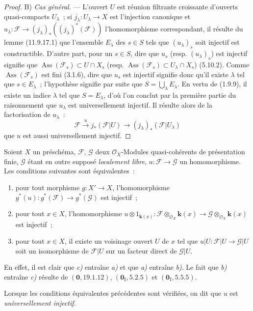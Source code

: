 \begin{proof}
B) \emph{Cas général.} --- L'ouvert $U$ est réunion filtrante croissante
d'ouverts quasi-compacts $U_\lambda$~; si $j_\lambda:U_\lambda\to X$ est
l'injection canonique et
$u_\lambda:\mathcal F\to(j_\lambda)_*((j_\lambda)^*(\mathcal F))$
l'homomorphisme correspondant, il résulte du lemme (11.9.17.1) que l'ensemble
$E_\lambda$ des $s\in S$ tels que $(u_\lambda)_s$ soit injectif est
constructible. D'autre part, pour un $s\in S$, dire que $u_s$ (resp.
$(u_\lambda)_s$) est injectif signifie que
$\operatorname{Ass}(\mathcal F_s)\subset U\cap X_s$ (resp.
$\operatorname{Ass}(\mathcal F_s)\subset U_\lambda\cap X_s$) (5.10.2).
Comme $\operatorname{Ass}(\mathcal F_s)$ est fini (3.1.6), dire que $u_s$ est
injectif signifie donc qu'il existe $\lambda$ tel que $s\in E_\lambda$~;
l'hypothèse signifie par suite que $S=\bigcup_\lambda E_\lambda$. En vertu de
(1.9.9), il existe un indice $\lambda$ tel que $S=E_\lambda$, d'où l'on
conclut par la première partie du raisonnement que $u_\lambda$ est
universellement injectif. Il résulte alors de la factorisation de $u_\lambda$~:
\[
\mathcal F\xrightarrow{u}j_*(\mathcal F|U)\longrightarrow
(j_\lambda)_*(\mathcal F|U_\lambda)
\]
que $u$ est aussi universellement injectif.
\end{proof}

\begin{remark}[11.9.18]
\label{IV.11.9.18-fr}
Soient $X$ un préschéma, $\mathcal F$, $\mathcal G$ deux
$\mathcal O_X$-Modules quasi-cohérents de présentation finie, $\mathcal G$
étant en outre supposé \emph{localement libre},
$u:\mathcal F\to\mathcal G$ un homomorphisme. Les conditions suivantes sont
équivalentes~:
\begin{enumerate}[label=\emph{\alph*)}]
  \item pour tout morphisme $g:X'\to X$, l'homomorphisme
  $g^*(u):g^*(\mathcal F)\to g^*(\mathcal G)$ est injectif~;
  \item pour tout $x\in X$, l'homomorphisme
  $u\otimes 1_{\mathbf{k}(x)}:\mathcal F\otimes_{\mathcal O_X}\boldsymbol{k}(x)
  \to\mathcal G\otimes_{\mathcal O_X}\boldsymbol{k}(x)$ est injectif~;
  \item pour tout $x\in X$, il existe un voisinage ouvert $U$ de $x$ tel que
  $u|U:\mathcal F|U\to\mathcal G|U$ soit un isomorphisme de $\mathcal F|U$
  sur un facteur direct de $\mathcal G|U$.
\end{enumerate}

En effet, il est clair que \emph{c)} entraîne \emph{a)} et que \emph{a)} entraîne \emph{b)}. Le fait que
\emph{b)} entraîne \emph{c)} résulte de $(\mathbf 0,19.1.12)$,
$(\mathbf 0_{\mathrm I},5.2.5)$ et $(\mathbf 0_{\mathrm I},5.5.5)$.

Lorsque les conditions équivalentes précédentes sont vérifiées, on dit que
$u$ est \emph{universellement injectif}.
\end{remark}
